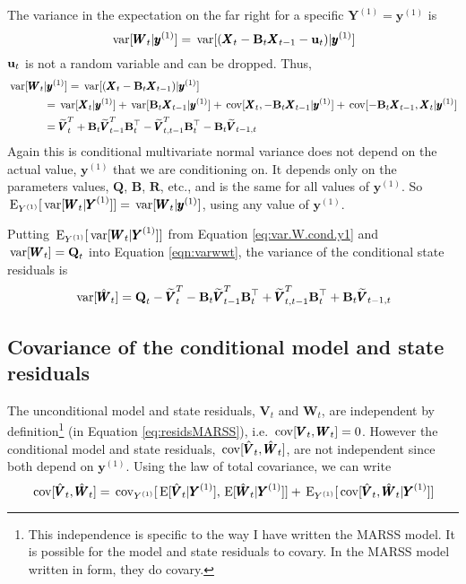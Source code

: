 \documentclass[]{article}
\def\UPS{\mbox{\boldmath $\Upsilon$}}
\def\BB{\mbox{$\mathbf B$}}	\def\bb{\mbox{$\mathbf b$}} \def\Bb{\mbox{$\mathbf J$}} \def\Ba{\mbox{$\mathbf L$}} \def\Bm{\UPS}
\def\E{\,\textup{\textrm{E}}}
\def\QQ{\mbox{$\mathbf Q$}}	 \def\qq{\mbox{$\mathbf q$}} \def\Qb{\mbox{$\mathbf G$}}  \def\Qm{\mathbb{Q}}
\def\RR{\mbox{$\mathbf R$}}	 \def\rr{\mbox{$\mathbf r$}} \def\Rb{\mbox{$\mathbf H$}}	\def\Rm{\mathbb{R}}
\def\VV{\mbox{$\pmb{V}$}}	\def\vv{\mbox{$\pmb{v}$}}
\def\WW{\mbox{$\pmb{W}$}}	\def\ww{\mbox{$\pmb{w}$}}
\def\XX{\mbox{$\pmb{X}$}}	\def\xx{\mbox{$\pmb{x}$}}
\def\YY{\mbox{$\pmb{Y}$}}	\def\yy{\mbox{$\pmb{y}$}}
\def\var{\,\textup{\textrm{var}}}
\def\cov{\,\textup{\textrm{cov}}}
\def\hatVt{\widetilde{\VV}_t^T}
\def\hatVtm{\widetilde{\VV}_{t-1}^T}
\def\hatVttm{\widetilde{\VV}_{t,t-1}^T}
\begin{document}
The variance in the expectation on the far right for a specific $\YY^{(1)}=\yy^{(1)}$ is
\begin{equation}
\var[\WW_t|\yy^{(1)}] = \var[ (\XX_t - \BB_t\XX_{t-1}-\uu_t) | \yy^{(1)} ]
\end{equation}
$\mbox{$\mathbf u$}_t$  is not a random variable and can be dropped. Thus,
\begin{equation}\label{eq:var.W.cond.y1}
\begin{split}
\var[\WW_t&|\yy^{(1)}] = \var[ (\XX_t - \BB_t\XX_{t-1}) | \yy^{(1)} ] \\
& = \var[ \XX_t | \yy^{(1)} ] + \var[\BB_t\XX_{t-1} | \yy^{(1)} ] + \cov[\XX_t, -\BB_t\XX_{t-1} | \yy^{(1)} ] + \cov[ -\BB_t\XX_{t-1}, \XX_t | \yy^{(1)} ]\\
& = \hatVt + \BB_t \hatVtm \BB_t^\top - \hatVttm \BB_t^\top - \BB_t\widetilde{\VV}_{t-1,t}
\end{split}
\end{equation}
Again this is conditional multivariate normal variance does not depend on the actual value, $\yy^{(1)}$ that we are conditioning on.  It depends only on the parameters values, $\QQ$, $\BB$, $\RR$, etc., and is the same for all values of $\yy^{(1)}$. So $\E_{Y^{(1)}}[\var[\WW_t|\YY^{(1)}]] = \var[\WW_t|\yy^{(1)}]$, using any value of $\yy^{(1)}$.

Putting $\E_{Y^{(1)}}[\var[\WW_t|\YY^{(1)}]]$ from Equation \ref{eq:var.W.cond.y1} and $\var[\WW_t]=\QQ_t$ into Equation \ref{eqn:varwwt}, the variance of the conditional state residuals is
\begin{equation}
\var[\hat{\WW}_t] = \QQ_t - \hatVt - \BB_t \hatVtm \BB_t^\top + \hatVttm \BB_t^\top + \BB_t\widetilde{\VV}_{t-1,t}
\end{equation}

\subsection{Covariance of the conditional model and state residuals}
The unconditional model and state residuals, $\VV_t$ and $\WW_t$, are independent by definition\footnote{This independence is specific to the way I have written the MARSS model. It is possible for the model and state residuals to covary. In the MARSS model written in \citet{Harveyetal1998} form, they do covary.} (in Equation \ref{eq:residsMARSS}), i.e. $\cov[\VV_t,\WW_t]=0$.  However the conditional model and state residuals, $\cov[\hat{\VV}_t,\hat{\WW}_t]$, are not independent since both depend on $\yy^{(1)}$.  
Using the law of total covariance, we can write
\begin{equation}\label{eqn:covhatVtWt1}
\cov[\hat{\VV}_t,\hat{\WW}_t] = 
\cov_{Y^{(1)}}[\E[\hat{\VV}_t|\YY^{(1)}],\E[\hat{\WW}_t|\YY^{(1)}]] + \E_{Y^{(1)}}[\cov[\hat{\VV}_t, \hat{\WW}_t|\YY^{(1)}]]
\end{equation}
\end{document}
